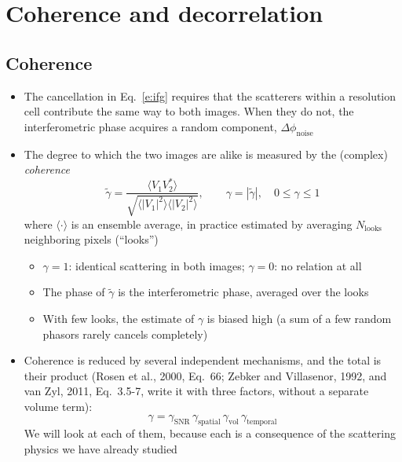 \documentclass[11pt, oneside]{article}
\newcommand{\Nlooks}{N_\mathrm{looks}}
\newcommand{\gt}{\tilde{\gamma}}
\begin{document}
\section{Coherence and decorrelation}
\label{s:coherence}

\subsection{Coherence}

\begin{itemize}
	\item The cancellation in Eq.~\eqref{e:ifg} requires that the scatterers within a resolution cell contribute the same way to both images. When they do not, the interferometric phase acquires a random component, $\Delta\phi_\mathrm{noise}$
	\item The degree to which the two images are alike is measured by the (complex) \emph{coherence}
	\begin{equation}
		\label{e:coh}
		\gt = \frac{\langle V_1V_2^*\rangle}{\sqrt{\langle|V_1|^2\rangle\langle|V_2|^2\rangle}}, \qquad \gamma = |\gt|, \quad 0 \le \gamma \le 1
	\end{equation}
	where $\langle\cdot\rangle$ is an ensemble average, in practice estimated by averaging $\Nlooks$ neighboring pixels (``looks'')
	\begin{itemize}
		\item $\gamma = 1$: identical scattering in both images; $\gamma = 0$: no relation at all
		\item The phase of $\gt$ is the interferometric phase, averaged over the looks
		\item With few looks, the estimate of $\gamma$ is biased high (a sum of a few random phasors rarely cancels completely)
	\end{itemize}
	\item Coherence is reduced by several independent mechanisms, and the total is their product (Rosen et al., 2000, Eq.~66; Zebker and Villasenor, 1992, and van Zyl, 2011, Eq.~3.5-7, write it with three factors, without a separate volume term):
	\begin{equation}
		\label{e:cohprod}
		\gamma = \gamma_\mathrm{SNR}\,\gamma_\mathrm{spatial}\,\gamma_\mathrm{vol}\,\gamma_\mathrm{temporal}
	\end{equation}
	We will look at each of them, because each is a consequence of the scattering physics we have already studied
\end{itemize}
\end{document}
